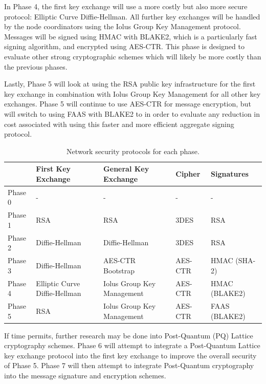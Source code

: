 \documentclass[tikz,a4paper,titlepage]{article}
\begin{document}
In Phase 4, the first key exchange will use a more costly but also more secure protocol: Elliptic Curve Diffie-Hellman. All further key exchanges will be handled by the node coordinators using the Iolus Group Key Management protocol. Messages will be signed using HMAC with BLAKE2, which is a particularly fast signing algorithm, and encrypted using AES-CTR. This phase is designed to evaluate other strong cryptographic schemes which will likely be more costly than the previous phases.

Lastly, Phase 5 will look at using the RSA public key infrastructure for the first key exchange in combination with Iolus Group Key Management for all other key exchanges. Phase 5 will continue to use AES-CTR for message encryption, but will switch to using FAAS with BLAKE2 to in order to evaluate any reduction in cost associated with using this faster and more efficient aggregate signing protocol. 


\begin{table}[h]
\centering
\begin{tabular}{|l|l|l|l|l|}
\hline
        & First Key Exchange & General Key Exchange & Cipher & Signatures \\ \hline
Phase 0 & - & - & - & - \\ \hline
Phase 1 & RSA & RSA & 3DES & RSA \\ \hline
Phase 2 & Diffie-Hellman & Diffie-Hellman & 3DES & RSA \\ \hline
Phase 3 & Diffie-Hellman & AES-CTR Bootstrap & AES-CTR & HMAC (SHA-2) \\ \hline
Phase 4 & Elliptic Curve Diffie-Hellman & Iolus Group Key Management & AES-CTR & HMAC (BLAKE2) \\ \hline
Phase 5 & RSA & Iolus Group Key Management & AES-CTR & FAAS (BLAKE2) \\ \hline
\end{tabular}

\caption{Network security protocols for each phase.}
\label{ResearchPhases}
\end{table}

If time permits, further research may be done into Post-Quantum (PQ) Lattice cryptography schemes. Phase 6 will attempt to integrate a Post-Quantum Lattice key exchange protocol into the first key exchange to improve the overall security of Phase 5. Phase 7 will then attempt to integrate Post-Quantum cryptography into the message signature and encryption schemes.
\end{document}
